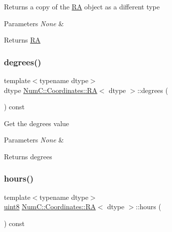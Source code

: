 Returns a copy of the \mbox{\hyperlink{class_num_c_1_1_coordinates_1_1_r_a}{RA}} object as a different type


\begin{DoxyParams}{Parameters}
{\em None} & \\
\hline
\end{DoxyParams}
\begin{DoxyReturn}{Returns}
\mbox{\hyperlink{class_num_c_1_1_coordinates_1_1_r_a}{RA}} 
\end{DoxyReturn}
\mbox{\label{class_num_c_1_1_coordinates_1_1_r_a_a6993ec638e01b191d7fd7b8c88476a99}} 
\subsubsection{\texorpdfstring{degrees()}{degrees()}}
{\footnotesize\ttfamily template$<$typename dtype$>$ \\
dtype \mbox{\hyperlink{class_num_c_1_1_coordinates_1_1_r_a}{Num\+C\+::\+Coordinates\+::\+RA}}$<$ dtype $>$\+::degrees (\begin{DoxyParamCaption}{ }\end{DoxyParamCaption}) const\hspace{0.3cm}{\ttfamily [inline]}}

Get the degrees value


\begin{DoxyParams}{Parameters}
{\em None} & \\
\hline
\end{DoxyParams}
\begin{DoxyReturn}{Returns}
degrees 
\end{DoxyReturn}
\mbox{\label{class_num_c_1_1_coordinates_1_1_r_a_a85d46e5a7b720aaf60fcf424c0d303e6}} 
\subsubsection{\texorpdfstring{hours()}{hours()}}
{\footnotesize\ttfamily template$<$typename dtype$>$ \\
\mbox{\hyperlink{namespace_num_c_a60b2e2f49e1ff61059731c154e560869}{uint8}} \mbox{\hyperlink{class_num_c_1_1_coordinates_1_1_r_a}{Num\+C\+::\+Coordinates\+::\+RA}}$<$ dtype $>$\+::hours (\begin{DoxyParamCaption}{ }\end{DoxyParamCaption}) const\hspace{0.3cm}{\ttfamily [inline]}}

